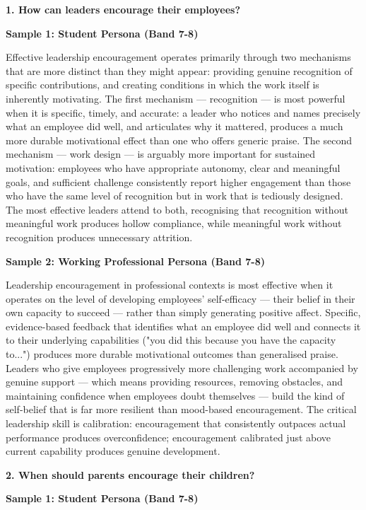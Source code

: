 \partthreeheader

\begin{ieltsquestion}
\textbf{1. How can leaders encourage their employees?}
\end{ieltsquestion}
\textbf{Sample 1: Student Persona (Band 7-8)}

Effective leadership encouragement operates primarily through two mechanisms that are more distinct than they might appear: providing genuine recognition of specific contributions, and creating conditions in which the work itself is inherently motivating. The first mechanism — recognition — is most powerful when it is specific, timely, and accurate: a leader who notices and names precisely what an employee did well, and articulates why it mattered, produces a much more durable motivational effect than one who offers generic praise. The second mechanism — work design — is arguably more important for sustained motivation: employees who have appropriate autonomy, clear and meaningful goals, and sufficient challenge consistently report higher engagement than those who have the same level of recognition but in work that is tediously designed. The most effective leaders attend to both, recognising that recognition without meaningful work produces hollow compliance, while meaningful work without recognition produces unnecessary attrition.

\textbf{Sample 2: Working Professional Persona (Band 7-8)}

Leadership encouragement in professional contexts is most effective when it operates on the level of developing employees' self-efficacy — their belief in their own capacity to succeed — rather than simply generating positive affect. Specific, evidence-based feedback that identifies what an employee did well and connects it to their underlying capabilities ("you did this because you have the capacity to...") produces more durable motivational outcomes than generalised praise. Leaders who give employees progressively more challenging work accompanied by genuine support — which means providing resources, removing obstacles, and maintaining confidence when employees doubt themselves — build the kind of self-belief that is far more resilient than mood-based encouragement. The critical leadership skill is calibration: encouragement that consistently outpaces actual performance produces overconfidence; encouragement calibrated just above current capability produces genuine development.

\separator

\begin{ieltsquestion}
\textbf{2. When should parents encourage their children?}
\end{ieltsquestion}
\textbf{Sample 1: Student Persona (Band 7-8)}

